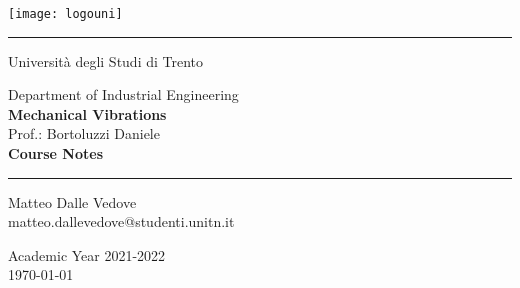 \documentclass[10pt,letterpaper,twoside,openright]{book}
\begin{document}
	
	\frontmatter
	
	\begin{center}
		\vspace{3cm}
		\thispagestyle{empty}
		\texttt{[image: logouni]}
		
		\vspace{1cm}
		\rule{5cm}{0.5pt}
		\vspace{1cm}		
		
		{\Large Università degli Studi di Trento}
		
		\vspace{2cm}
		{\Large Department of Industrial Engineering} \\ \vspace{2mm}
		{\LARGE \textbf{Mechanical Vibrations}} \\ \vspace{2mm}
		{\Large Prof.: Bortoluzzi Daniele}\\
		
		\vspace{2cm}
		{\LARGE \textbf{Course Notes}}
		
		\vspace{1cm}
		\rule{5cm}{0.5pt}
		\vspace{1cm}	
		
		{\large 
			Matteo Dalle Vedove \\
			\makeatletter
			matteo.dallevedove@studenti.unitn.it
			
			\vspace{2cm}
			Academic Year 2021-2022 \\ \today}
	\end{center}
	
	\tableofcontents
	\mainmatter
	
	
	
	\appendix
	
\end{document}
